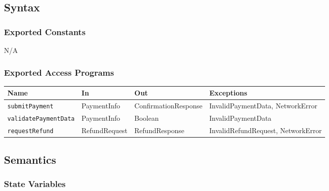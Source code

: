 \documentclass[12pt, titlepage]{article}
\begin{document}
\subsection{Syntax}

\subsubsection{Exported Constants}
N/A

\subsubsection{Exported Access Programs}

\begin{center}
\renewcommand{\arraystretch}{1.2}
\begin{tabularx}{\textwidth}{l l l X}
\toprule
\textbf{Name} & \textbf{In} & \textbf{Out} & \textbf{Exceptions} \\
\midrule
\texttt{submitPayment}       & PaymentInfo & ConfirmationResponse & InvalidPaymentData, NetworkError \\
\texttt{validatePaymentData} & PaymentInfo & Boolean              & InvalidPaymentData \\
\texttt{requestRefund}       & RefundRequest & RefundResponse      & InvalidRefundRequest, NetworkError \\
\bottomrule
\end{tabularx}
\end{center}

\subsection{Semantics}

\subsubsection{State Variables}
\end{document}
